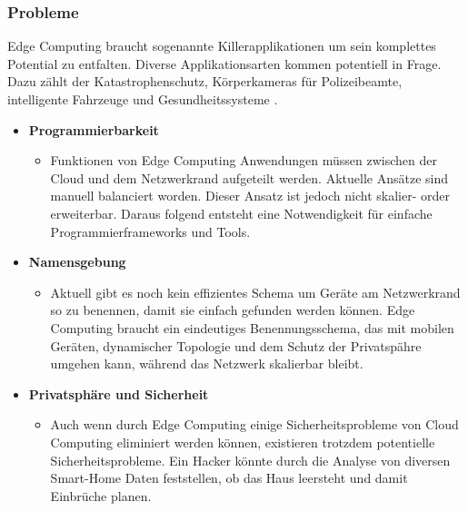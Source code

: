\documentclass{sigchi}
\begin{document}
\subsubsection{Probleme}
Edge Computing braucht sogenannte Killerapplikationen um sein komplettes Potential zu entfalten. Diverse Applikationsarten kommen potentiell in Frage. Dazu zählt der Katastrophenschutz, Körperkameras für Polizeibeamte, intelligente Fahrzeuge und Gesundheitssysteme \cite{promise-edge-computing:2016}.

\begin{itemize}
    \item \textbf{Programmierbarkeit}
    \begin{itemize}
        \item Funktionen von Edge Computing Anwendungen müssen zwischen der Cloud und dem Netzwerkrand aufgeteilt werden. Aktuelle Ansätze sind manuell balanciert worden. Dieser Ansatz ist jedoch nicht skalier- order erweiterbar. Daraus folgend entsteht eine Notwendigkeit für einfache Programmierframeworks und Tools.
    \end{itemize}
    \item \textbf{Namensgebung}
        \begin{itemize}
            \item Aktuell gibt es noch kein effizientes Schema um Geräte am Netzwerkrand so zu benennen, damit sie einfach gefunden werden können. Edge Computing braucht ein eindeutiges Benennungsschema, das mit mobilen Geräten, dynamischer Topologie und dem Schutz der Privatspähre umgehen kann, während das Netzwerk skalierbar bleibt.
        \end{itemize}
    \item \textbf{Privatsphäre und Sicherheit}
        \begin{itemize}
            \item Auch wenn durch Edge Computing einige Sicherheitsprobleme von Cloud Computing eliminiert werden können, existieren trotzdem potentielle Sicherheitsprobleme. Ein Hacker könnte durch die Analyse von diversen Smart-Home Daten feststellen, ob das Haus leersteht und damit Einbrüche planen.
        \end{itemize}
\end{itemize}
\end{document}
